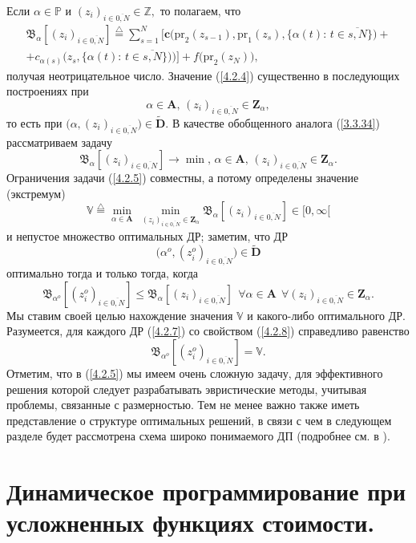 \documentclass[11pt,twoside,openany]{report}
\newcommand{\bfn}{\begin{equation}}
\newcommand{\efn}{\end{equation}}
\newcommand{\df}{\stackrel{\triangle}{=}}
\newcommand{\ov}{\overline}
\newcommand{\al}{\alpha}
\newcommand{\fa}{\forall}
\newcommand{\bbz}{{\mathbb Z}}
\newcommand{\bbp}{{\mathbb P}}
\begin{document}
{Если $\al\in \bbp$ и $(z_i)_{i\in\ov{0,N}}\in \bbz,$ то полагаем, что
\begin{eqnarray}
&\mathfrak{B}_\al [(z_i)_{i\in\ov{0,N}}] \df \sum\limits_{s=1}^N
\bigl[\mathbf{c}\bigl(\mathrm{pr}_2(z_{s-1}),\mathrm{pr}_1(z_s),\{\al(t):\,
t\in \ov{s,N}\}\bigl) +
&\nonumber\\
&+  c_{\al(s)}\bigl(z_s,\{\al(t):\,t\in \ov{s,N}\}\bigl)\bigl)\bigl] +
f\bigl(\mathrm{pr}_2(z_N)\bigl),
&\label{4.2.4}
\end{eqnarray}
получая неотрицательное число. Значение (\ref{4.2.4}) существенно в
последующих построениях при
$$
\al\in \mathbf{A},\, (z_i)_{i\in\ov{0,N}}\in \mathbf{Z}_\al,
$$
то есть при $\bigl(\al,(z_i)_{i\in\ov{0,N}}\bigl)\in \widetilde{\mathbf{D}}.$
В качестве обобщенного аналога (\ref{3.3.34}) рассматриваем задачу
\bfn\label{4.2.5}
\mathfrak{B}_\al[(z_i)_{i\in\ov{0,N}}]\longrightarrow \min,\,\al\in \mathbf{A},\,
(z_i)_{i\in\ov{0,N}}\in \mathbf{Z}_\al.
\efn
Ограничения задачи (\ref{4.2.5}) совместны, а потому определены значение
(экстремум)
\bfn\label{4.2.6}
\mathbb{V} \df \min\limits_{\al\in \mathbf{A}}\
\min\limits_{(z_i)_{i\in\ov{0,N}}\in \mathbf{Z}_\al}
\mathfrak{B}_\al[(z_i)_{i\in\ov{0,N}}]\in [0,\infty[
\efn
и непустое множество оптимальных ДР; заметим, что ДР
\bfn\label{4.2.7}
\bigl(\al^o,(z_i^o)_{i\in\ov{0,N}}\bigl)\in \widetilde{\mathbf{D}}
\efn
оптимально тогда и только тогда, когда
\bfn\label{4.2.8}
\mathfrak{B}_{\al^o}[(z_i^o)_{i\in\ov{0,N}}]\leqslant \mathfrak{B}_\al
[(z_i)_{i\in\ov{0,N}}]\ \ \fa \al\in \mathbf{A}\ \ \fa
(z_i)_{i\in\ov{0,N}}\in \mathbf{Z}_\al.
\efn
Мы ставим своей целью нахождение значения $\mathbb{V}$ и какого-либо
оптимального ДР. Разумеется, для каждого ДР (\ref{4.2.7}) со свойством
(\ref{4.2.8}) справедливо равенство
$$
\mathfrak{B}_{\al^o}[(z_i^o)_{i\in\ov{0,N}}]  = \mathbb{V}.
$$
Отметим, что в (\ref{4.2.5}) мы имеем очень сложную задачу, для
эффективного решения которой следует разрабатывать эвристические методы,
учитывая проблемы, связанные с размерностью. Тем не менее важно также
иметь представление о структуре оптимальных решений, в связи с чем в
следующем разделе будет рассмотрена схема широко понимаемого ДП (подробнее
см. в \cite{Cha3`,Cha11`,Cha12`}).

\section{Динамическое программирование при усложненных функциях стоимости.}
\setcounter{equation}{0}

}
\end{document}
